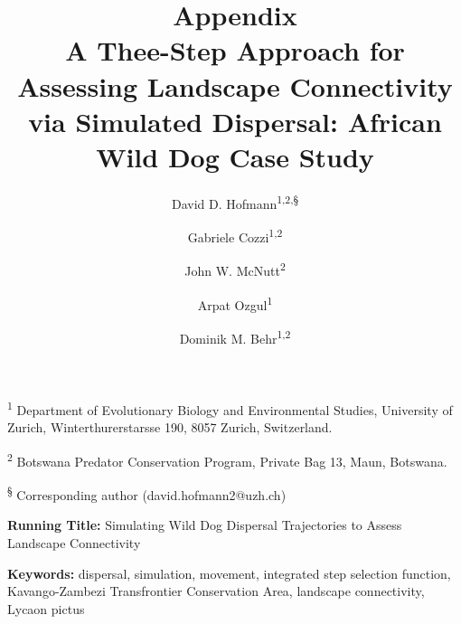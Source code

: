 \documentclass[abstract=off,10pt,a4paper,bibliography=totocnumbered]{article}
\title{\textbf{Appendix}\\ A Thee-Step Approach for Assessing Landscape
Connectivity via Simulated Dispersal: African Wild Dog Case Study}
\author{
  David D. Hofmann\textsuperscript{1,2,\S} \and
  Gabriele Cozzi\textsuperscript{1,2} \and
  John W. McNutt\textsuperscript{2} \and
  Arpat Ozgul\textsuperscript{1} \and
  Dominik M. Behr\textsuperscript{1,2}
}
\newcommand{\beginappendix}{%
  \setcounter{table}{0}
  \renewcommand{\thetable}{S\arabic{table}}%
  \setcounter{figure}{0}
  \renewcommand{\thefigure}{S\arabic{figure}}%
  \setcounter{equation}{0}
  \renewcommand{\theequation}{Equation S\arabic{equation}}%
  \setcounter{section}{0}
  \renewcommand{\thesection}{A.\arabic{section}}%
}
\begin{document}



\maketitle

\begin{flushleft}

 \vspace{0.5cm}

 \textsuperscript{1} Department of Evolutionary Biology and Environmental
 Studies, University of Zurich, Winterthurerstarsse 190, 8057 Zurich,
 Switzerland.

 \textsuperscript{2} Botswana Predator Conservation Program, Private Bag 13,
 Maun, Botswana.

 \textsuperscript{\S} Corresponding author (david.hofmann2@uzh.ch)

 \vspace{4cm}

\textbf{Running Title:} Simulating Wild Dog Dispersal Trajectories to Assess
Landscape Connectivity

\vspace{0.5cm}

\textbf{Keywords:} dispersal, simulation, movement, integrated step selection
function, Kavango-Zambezi Transfrontier Conservation Area, landscape
connectivity, Lycaon pictus

\end{flushleft}

\newpage



\appendix
\beginappendix

\newpage
\end{document}
